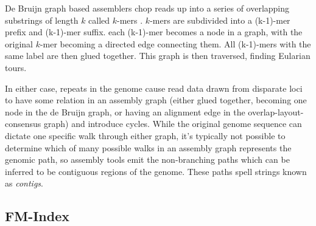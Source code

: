 \documentclass[doctor]{thesis}
\begin{document}
De Bruijn graph based assemblers chop reads up into a series of overlapping substrings of length $k$ called $k$-mers \cite{pevzner2001eulerian}.
$k$-mers are subdivided into a (k-1)-mer prefix and (k-1)-mer suffix.
each (k-1)-mer becomes a node in a graph, with the original $k$-mer becoming a directed edge connecting them.
All (k-1)-mers with the same label are then glued together.  This graph is then traversed, finding Eularian tours.  

In either case, repeats in the genome cause read data drawn from disparate loci to have some relation in an assembly graph (either glued together, becoming one node in the de Bruijn graph, or having an alignment edge in the overlap-layout-consensus graph) and introduce cycles.
While the original genome sequence can dictate one specific walk through either graph, it's typically not possible to determine which of many possible walks in an assembly graph represents the genomic path, so assembly tools emit the non-branching paths which can be inferred to be contiguous regions of the genome.
These paths spell strings known as \emph{contigs}.

\subsection{FM-Index}
\end{document}
